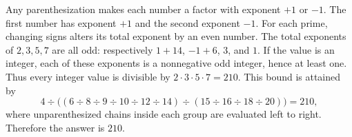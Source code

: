 Any parenthesization makes each number a factor with exponent $+1$ or $-1$. The first number has exponent $+1$ and the second exponent $-1$. For each prime, changing signs alters its total exponent by an even number. The total exponents of $2,3,5,7$ are all odd: respectively $1+14$, $-1+6$, $3$, and $1$. If the value is an integer, each of these exponents is a nonnegative odd integer, hence at least one. Thus every integer value is divisible by $2\cdot3\cdot5\cdot7=210$. This bound is attained by\[4\div\bigl((6\div8\div9\div10\div12\div14)\div(15\div16\div18\div20)\bigr)=210,\]where unparenthesized chains inside each group are evaluated left to right. Therefore the answer is $\boxed{210}$.
